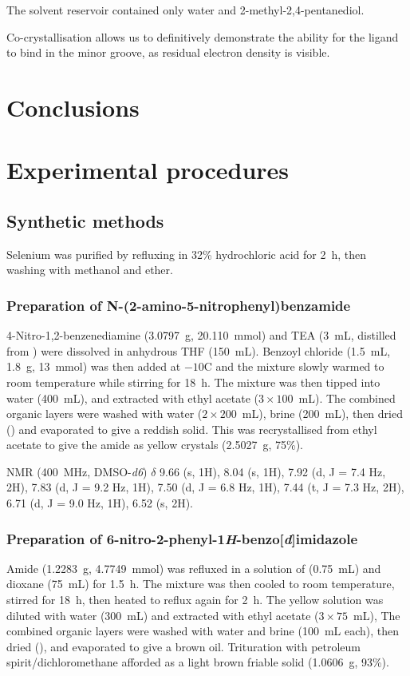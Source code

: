 \begin{refsection}
The solvent reservoir contained only water and 2-methyl-2,4-pentanediol.

Co-crystallisation allows us to definitively demonstrate the ability for the ligand to bind in the minor groove, as residual electron density is visible.


\section{Conclusions}

\section{Experimental procedures}

\subsection{Synthetic methods}

Selenium was purified by refluxing in 32\% hydrochloric acid for 2~h, then washing with methanol and ether.

\subsubsection{Preparation of N-(2-amino-5-nitrophenyl)benzamide }
4-Nitro-1,2-benzenediamine (3.0797~g, 20.110~mmol) and TEA (3~mL, distilled from ) were dissolved in anhydrous THF (150~mL).
Benzoyl chloride (1.5~mL, 1.8~g, 13~mmol) was then added at $-10$\degree C and the mixture slowly warmed to room temperature while stirring for 18~h.
The mixture was then tipped into water (400~mL), and extracted with ethyl acetate ($3\times100$~mL).
The combined organic layers were washed with water ($2\times200$~mL), brine (200~mL), then dried () and evaporated to give a reddish solid.
This was recrystallised from ethyl acetate to give the amide  as yellow crystals (2.5027~g, 75\%).

 NMR (400~MHz, DMSO-\emph{d6}) $\delta$ 9.66 (s, 1H), 8.04 (s, 1H), 7.92 (d, J = 7.4 Hz, 2H), 7.83 (d, J = 9.2 Hz, 1H), 7.50 (d, J = 6.8 Hz, 1H), 7.44 (t, J = 7.3 Hz, 2H), 6.71 (d, J = 9.0 Hz, 1H), 6.52 (s, 2H). 

\subsubsection{Preparation of 6-nitro-2-phenyl-1\emph{H}-benzo[\emph{d}]imidazole }
Amide  (1.2283~g, 4.7749~mmol) was refluxed in a solution of  (0.75~mL) and dioxane (75~mL) for 1.5~h. 
The mixture was then cooled to room temperature, stirred for 18~h, then heated to reflux again for 2~h.
The yellow solution was diluted with water (300~mL) and extracted with ethyl acetate ($3\times75$~mL),
The combined organic layers were washed with water and brine (100~mL each), then dried (), and evaporated to give a brown oil.
Trituration with petroleum spirit/dichloromethane afforded  as a light brown friable solid (1.0606~g, 93\%).


\end{refsection}
